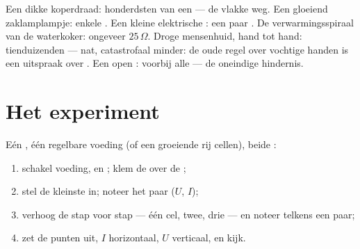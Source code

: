 \begin{example}\label{ex:g8:ohms-law:values}
Een  dikke koperdraad: honderdsten van een
 --- de vlakke weg. Een gloeiend
zaklamplampje: enkele . Een kleine
elektrische : een paar . De
verwarmingsspiraal van de waterkoker: ongeveer $25\,\Omega$. Droge
mensenhuid, hand tot hand: tienduizenden  --- nat,
catastrofaal minder: de oude regel over vochtige handen is een uitspraak
over . Een open :
 voorbij alle  --- de oneindige hindernis.
\end{example}

\section{Het experiment}

\begin{method}\label{met:g8:ohms-law:portrait}
Eén , één regelbare voeding (of een groeiende rij
cellen), beide :
\begin{enumerate}
  \item schakel voeding,  en
         ; klem de
         over de ;
  \item stel de kleinste  in; noteer het paar ($U$,
        $I$);
  \item verhoog de  stap voor stap --- één cel, twee,
        drie --- en noteer telkens een paar;
  \item zet de punten uit, $I$ horizontaal, $U$ verticaal, en kijk.
\end{enumerate}
\end{method}

